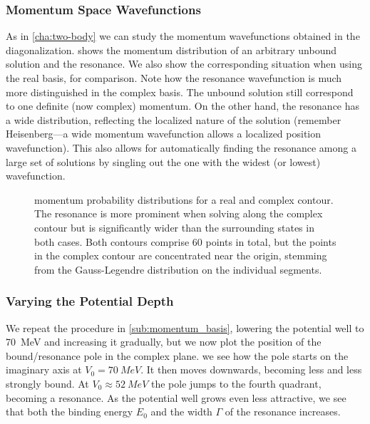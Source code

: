 \documentclass[../main/report.tex]{subfiles}
\begin{document}


\subsubsection{Momentum Space Wavefunctions}

As in \cref{cha:two-body} we can study the momentum wavefunctions obtained in the diagonalization.
 shows the momentum distribution of an arbitrary unbound solution and the resonance. We also show the corresponding situation when using the real basis, for comparison. Note how the resonance wavefunction is much more distinguished in the complex basis.  
The unbound solution still correspond to one definite (now complex) momentum. 
On the other hand, the resonance has a wide distribution, reflecting the localized nature of the solution 
(remember Heisenberg---a wide momentum wavefunction allows a localized position wavefunction). 
This also allows for automatically finding the resonance among a large set of solutions by singling out the one with the widest (or lowest) wavefunction.


\begin{figure}
\caption{ momentum probability distributions for a real and complex contour. The resonance is more prominent when solving along the complex contour but is significantly wider than the surrounding states in both cases. Both contours comprise 60 points in total, but the points in the complex contour are concentrated near the origin, stemming from the Gauss-Legendre distribution on the individual segments.} 
\label{fig:complex_mom_wavefunctions}
\end{figure}



\subsubsection{Varying the Potential Depth}
We repeat the procedure in \cref{sub:momentum_basis}, lowering the potential well to \SI{70}{MeV} and increasing it gradually, but we now plot the position of the bound/resonance pole in the complex plane.
 we see how the pole starts on the imaginary axis at $V_0 = \SI{70}{MeV}$. 
It then moves downwards, becoming less and less strongly bound.
At $V_0 \approx \SI{52}{MeV}$ the pole jumps to the fourth quadrant, becoming a resonance.
As the potential well grows even less attractive, we see that both the binding energy $E_0$ and the width $\Gamma$ of the resonance increases.
\end{document}
